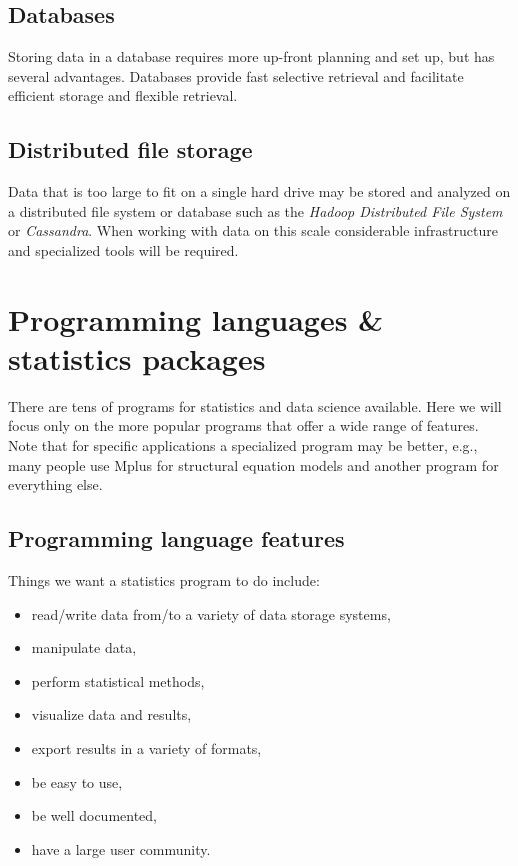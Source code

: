 \documentclass[
]{book}
\providecommand{\tightlist}{%
  \setlength{\itemsep}{0pt}\setlength{\parskip}{0pt}}
\begin{document}
\hypertarget{databases}{%
\subsection{Databases}\label{databases}}

Storing data in a database requires more up-front planning and set up, but has several advantages. Databases provide fast selective retrieval and facilitate efficient storage and flexible retrieval.

\hypertarget{distributed-file-storage}{%
\subsection{Distributed file storage}\label{distributed-file-storage}}

Data that is too large to fit on a single hard drive may be stored and analyzed on a distributed file system or database such as the \emph{Hadoop Distributed File System} or \emph{Cassandra}. When working with data on this scale considerable infrastructure and specialized tools will be required.

\hypertarget{programming-languages-statistics-packages}{%
\section{Programming languages \& statistics packages}\label{programming-languages-statistics-packages}}

There are tens of programs for statistics and data science available. Here we will focus only on the more popular programs that offer a wide range of features. Note that for specific applications a specialized program may be better, e.g., many people use Mplus for structural equation models and another program for everything else.

\hypertarget{programming-language-features}{%
\subsection{Programming language features}\label{programming-language-features}}

Things we want a statistics program to do include:

\begin{itemize}
\tightlist
\item
  read/write data from/to a variety of data storage systems,
\item
  manipulate data,
\item
  perform statistical methods,
\item
  visualize data and results,
\item
  export results in a variety of formats,
\item
  be easy to use,
\item
  be well documented,
\item
  have a large user community.
\end{itemize}
\end{document}
